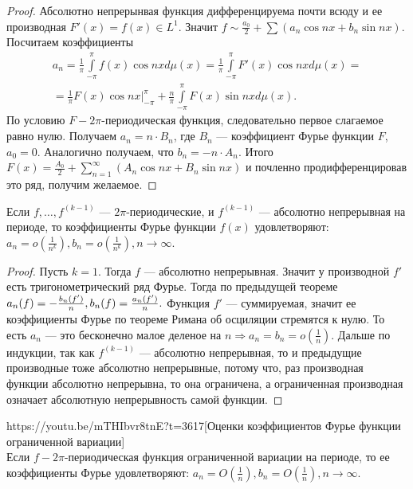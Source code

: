 \begin{proof}
	Абсолютно непрерынвая функция дифференцируема почти всюду и ее производная $F'(x)=f(x)\in L^1$. Значит $f\sim\frac{a_0}{2}+\sum\limits(a_n\cos nx+b_n\sin nx)$. Посчитаем коэффициенты 
	\begin{multline*}
		a_n=\frac{1}{\pi}\int\limits_{-\pi}^\pi f(x)\cos nx d\mu(x)=\frac{1}{\pi}\int\limits_{-\pi}^\pi F'(x)\cos nxd\mu(x) =\\=\frac{1}{\pi}F(x)\cos nx|_{-\pi}^\pi+\frac{n}{\pi}\int\limits_{-\pi}^\pi F(x)\sin nxd\mu(x).
	\end{multline*}
По условию $F-2\pi$-периодическая функция, следовательно первое слагаемое равно нулю. Получаем $a_n = n\cdot B_n$, где $B_n$ --- коэффициент Фурье функции $F$, $a_0 = 0$. Аналогично получаем, что $b_n=-n\cdot A_n$. Итого $F(x)=\frac{A_0}{2}+\sum\limits_{n=1}^\infty (A_n\cos nx + B_n\sin nx)$ и почленно продифференцировав это ряд, получим желаемое.
\end{proof}

\begin{corollary}
	Если $f,\ldots,f^{(k-1)}$ --- $2\pi$-периодические, и $f^{(k-1)}$ --- абсолютно непрерывная на периоде, то коэффициенты Фурье функции $f(x)$ удовлетворяют: ${a_n=o(\frac{1}{n^k}), b_n=o(\frac{1}{n^k}), n\to\infty}$.
\end{corollary}

\begin{proof}
	Пусть $k=1$. Тогда $f$ --- абсолютно непрерывная. Значит у производной $f'$ есть тригонометрический ряд Фурье. Тогда по предыдущей теореме $a_n(f)=-\frac{b_n(f')}{n},\\ b_n(f)=\frac{a_n(f')}{n}.$ Функция $f'$ --- суммируемая, значит ее коэффициенты Фурье по теореме Римана об осциляции стремятся к нулю. То есть $a_n$ --- это бесконечно малое деленое на $n\Rightarrow a_n=b_n=o(\frac{1}{n})$. Дальше по индукции, так как $f^{(k-1)}$ --- абсолютно непрерывная, то и предыдущие производные тоже абсолютно непрерывные, потому что, раз производная функции абсолютно непрерывна, то она ограничена, а ограниченная производная означает абсолютную непрерывность самой функции.
\end{proof}

\begin{linkthm}{https://youtu.be/mTHIbvr8tnE?t=3617}[Оценки коэффициентов Фурье функции ограниченной вариации]\ \\
	Если $f-2\pi$-периодическая функция ограниченной вариации на периоде, то ее коэффициенты Фурье удовлетворяют: $a_n=O\left(\frac{1}{n}\right), b_n=O\left(\frac{1}{n}\right), n\to\infty$.
\end{linkthm}

